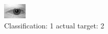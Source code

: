 \begin{figure}[h!]
\begin{center}
\includegraphics[width=0.60\columnwidth]{figures/ID506_class_1_target_2.png}
\end{center}
\caption{ Classification: 1 actual target: 2}
\label{fig:ID506_class_1_target_2}
\end{figure}
